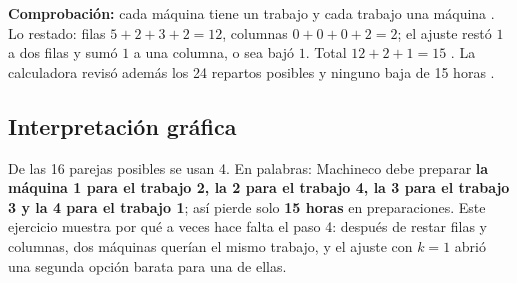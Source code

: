 \documentclass[11pt,a4paper]{article}
\begin{document}
\textbf{Comprobación:} cada máquina tiene un trabajo y cada trabajo una máquina \checkmark. Lo restado:
filas $5 + 2 + 3 + 2 = 12$, columnas $0 + 0 + 0 + 2 = 2$; el ajuste restó $1$ a dos filas y sumó $1$ a una
columna, o sea bajó $1$. Total $12 + 2 + 1 = 15$ \checkmark. La calculadora revisó además los 24 repartos posibles
y ninguno baja de 15 horas \checkmark.

\subsection*{Interpretación gráfica}
\noindent\begin{minipage}[c]{0.52\textwidth}\centering
{}
\end{minipage}\hfill
\begin{minipage}[c]{0.44\textwidth}
De las 16 parejas posibles se usan 4. En palabras: Machineco debe preparar \textbf{la máquina 1 para el trabajo 2,
la 2 para el trabajo 4, la 3 para el trabajo 3 y la 4 para el trabajo 1}; así pierde solo \textbf{15 horas} en
preparaciones. Este ejercicio muestra por qué a veces hace falta el paso 4: después de restar filas y columnas, dos
máquinas querían el mismo trabajo, y el ajuste con $k = 1$ abrió una segunda opción barata para una de ellas.
\end{minipage}
\par

\bigskip
\end{document}
